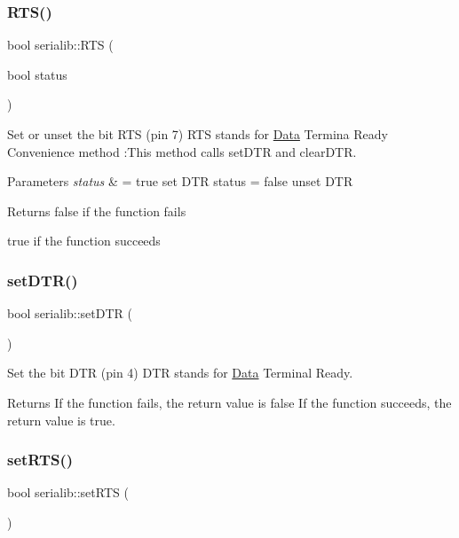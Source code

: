 \subsubsection{\texorpdfstring{R\+T\+S()}{RTS()}}
{\footnotesize\ttfamily bool serialib\+::\+R\+TS (\begin{DoxyParamCaption}\item[{bool}]{status }\end{DoxyParamCaption})}



Set or unset the bit R\+TS (pin 7) R\+TS stands for \hyperlink{classData}{Data} Termina Ready Convenience method \+:This method calls set\+D\+TR and clear\+D\+TR. 


\begin{DoxyParams}{Parameters}
{\em status} & = true set D\+TR status = false unset D\+TR \\
\hline
\end{DoxyParams}
\begin{DoxyReturn}{Returns}
false if the function fails 

true if the function succeeds 
\end{DoxyReturn}
\mbox{\label{classserialib_a7564b9e28b1b50675d9d6d3fabc896c0}} 
\subsubsection{\texorpdfstring{set\+D\+T\+R()}{setDTR()}}
{\footnotesize\ttfamily bool serialib\+::set\+D\+TR (\begin{DoxyParamCaption}{ }\end{DoxyParamCaption})}



Set the bit D\+TR (pin 4) D\+TR stands for \hyperlink{classData}{Data} Terminal Ready. 

\begin{DoxyReturn}{Returns}
If the function fails, the return value is false If the function succeeds, the return value is true. 
\end{DoxyReturn}
\mbox{\label{classserialib_a21767ffe86a76f300a71c496fbcc26a1}} 
\subsubsection{\texorpdfstring{set\+R\+T\+S()}{setRTS()}}
{\footnotesize\ttfamily bool serialib\+::set\+R\+TS (\begin{DoxyParamCaption}{ }\end{DoxyParamCaption})}



